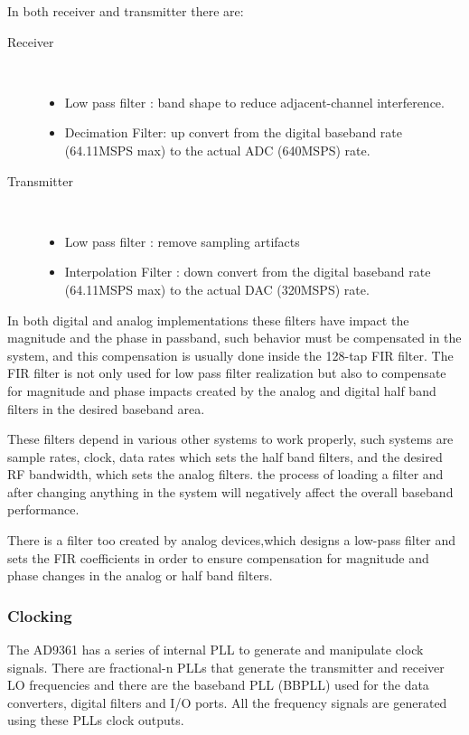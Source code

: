 In both receiver and transmitter there are:
\begin{description}
	\item[Receiver] \hfill \\
	\begin{itemize}
		\item Low pass filter : band shape to reduce adjacent-channel interference.
		\item Decimation Filter: up convert from the digital baseband rate (64.11MSPS max) to the actual ADC (640MSPS) rate.
	\end{itemize}
	\item[Transmitter] \hfill \\
\begin{itemize}
		\item Low pass filter : remove sampling artifacts
		\item Interpolation Filter : down convert from the digital baseband rate (64.11MSPS max) to the actual DAC (320MSPS) rate.
	\end{itemize}
\end{description}

In both digital and analog implementations these filters have impact the magnitude and the phase in passband, such behavior must be compensated in the system, and this compensation is usually done inside the 128-tap FIR filter. The FIR filter is not only used for low pass filter realization but also to compensate for magnitude and phase impacts created by the analog and digital half band filters in the desired baseband area.

These filters depend in various other systems to work properly, such systems are sample rates, clock, data rates which sets the half band filters, and the desired RF bandwidth, which sets the analog filters. the process of loading a filter and after changing anything in the system will negatively affect the overall baseband performance.

There is a filter too created by analog devices,which designs a low-pass filter and sets the FIR coefficients in order to ensure compensation for magnitude and phase changes in the analog or half band filters.

\subsubsection{Clocking}

The AD9361 has a series of internal PLL to generate and manipulate clock signals. There are fractional-n PLLs that generate the transmitter and receiver LO frequencies and there are the baseband PLL (BBPLL) used for the data converters, digital filters and I/O ports. All the frequency signals are generated using these PLLs clock outputs.

